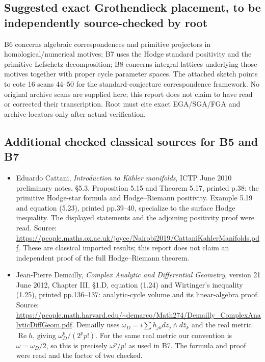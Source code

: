 \subsection{Suggested exact Grothendieck placement, to be independently source-checked by root}\label{suggested-exact-grothendieck-placement-to-be-independently-source-checked-by-root}

B6 concerns algebraic correspondences and primitive projectors in homological/numerical motives; B7 uses the Hodge standard positivity and the primitive Lefschetz decomposition; B8 concerns integral lattices underlying those motives together with proper cycle parameter spaces. The attached sketch points to cote 16 scans 44--50 for the standard-conjecture correspondence framework. No original archive scans are supplied here; this report does not claim to have read or corrected their transcription. Root must cite exact EGA/SGA/FGA and archive locators only after actual verification.

\subsection{Additional checked classical sources for B5 and B7}\label{additional-checked-classical-sources-for-b5-and-b7}

\begin{itemize}
\tightlist
\item
  Eduardo Cattani, \emph{Introduction to Kähler manifolds}, ICTP June 2010 preliminary notes, §5.3, Proposition 5.15 and Theorem 5.17, printed p.38: the primitive Hodge-star formula and Hodge--Riemann positivity. Example 5.19 and equation (5.23), printed pp.39--40, specialize to the surface Hodge inequality. The displayed statements and the adjoining positivity proof were read. Source: \url{https://people.maths.ox.ac.uk/joyce/Nairobi2019/CattaniKahlerManifolds.pdf}. These are classical imported results; this report does not claim an independent proof of the full Hodge--Riemann theorem.
\item
  Jean-Pierre Demailly, \emph{Complex Analytic and Differential Geometry}, version 21 June 2012, Chapter III, §1.D, equation (1.24) and Wirtinger's inequality (1.25), printed pp.136--137: analytic-cycle volume and its linear-algebra proof. Source: \url{https://people.math.harvard.edu/~demarco/Math274/Demailly_ComplexAnalyticDiffGeom.pdf}. Demailly uses \(\omega_D=i\sum h_{jk}dz_j\wedge d\bar z_k\) and the real metric \(\operatorname{Re}h\), giving \(\omega_D^p/(2^p p!)\). For the same real metric our convention is \(\omega=\omega_D/2\), so this is precisely \(\omega^p/p!\) as used in B7. The formula and proof were read and the factor of two checked.
\end{itemize}
